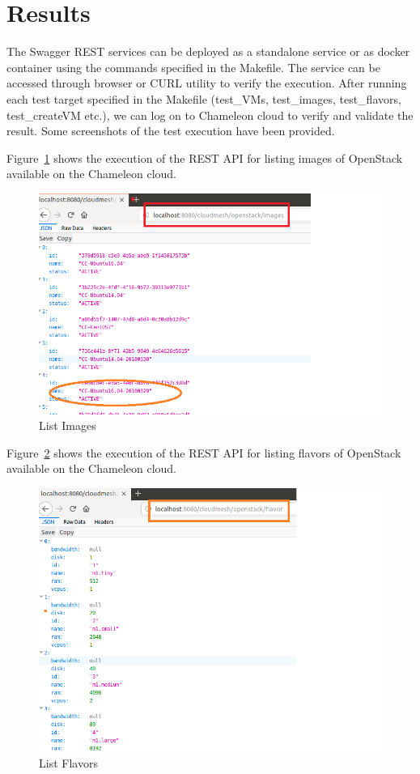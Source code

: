 \section{Results}
The Swagger REST services can be deployed as a standalone service or as docker
container using the commands specified in the Makefile. The service can be
accessed through browser or CURL utility to verify the execution. After running
each test target specified in the Makefile (test\_VMs, test\_images,
test\_flavors, test\_createVM etc.), we can log on to Chameleon cloud to verify
and validate the result. Some screenshots of the test execution have been
provided. 

Figure~\ref{fig:list-images} shows the execution of the REST API for listing
images of OpenStack available on the Chameleon cloud. 

\begin{figure}[!ht]
        \centering\includegraphics[width=\columnwidth]{images/images.png}
        \caption{List Images}
        \label{fig:list-images}
\end{figure}

Figure~\ref{fig:list-flavors} shows the execution of the REST API for listing
flavors of OpenStack available on the Chameleon cloud. 

\begin{figure}[!ht]
        \centering\includegraphics[width=\columnwidth]{images/flavors.png}
        \caption{List Flavors}
        \label{fig:list-flavors}
\end{figure}

